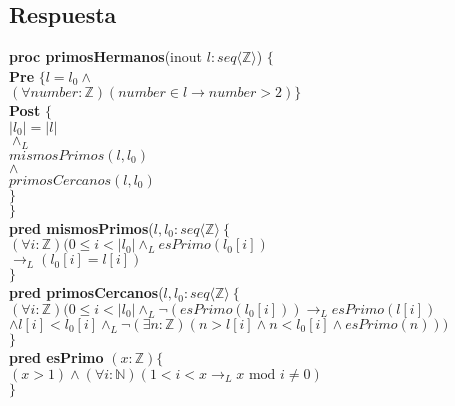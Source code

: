 \documentclass[a4paper]{article}
\begin{document}
\subsection*{Respuesta}
			
			\textbf{proc primosHermanos}(inout $l:seq\langle \mathbb{Z}\rangle$) $\{$\smallskip \\
			\hspace*{6mm} \textbf{Pre }$\{l=l_0 \wedge$\\
			\hspace*{6mm} $(\forall number:\mathbb{Z})(number\in l \rightarrow
			 number>2)\}$\smallskip \\
			\hspace*{6mm} \textbf{Post }$\{$\\
			\hspace*{6mm} $|l_0|=|l|$\\
			\hspace*{6mm} $\wedge_L$\\
			\hspace*{6mm} $mismosPrimos(l,l_0 )$\\
			\hspace*{6mm} $\wedge$\\
			\hspace*{6mm} $primosCercanos(l,l_0)$\\
			\hspace*{6mm} $\}$\\
			\hspace*{5mm}$\}$\smallskip \\
			
			\textbf{pred mismosPrimos}($l,l_0: seq\langle\mathbb{Z}\rangle
			\ \{$\smallskip \\
			\hspace*{6mm}$(\forall i:\mathbb{Z})(0\leq i < |l_0|\wedge_L esPrimo(l_0[i])$\\
			\hspace*{6mm}$\rightarrow_L(l_0[i]=l[i])$\\
			\hspace*{5mm}$\}$\smallskip \\
			
			\textbf{pred primosCercanos}($l,l_0: seq\langle\mathbb{Z}\rangle
			\ \{$\smallskip \\
			\hspace*{6mm}$(\forall i:\mathbb{Z})(0\leq i<|l_0|\wedge_L\neg(esPrimo(l_0[i]))
			\rightarrow_L esPrimo(l[i])$\\
			\hspace*{6mm}$\wedge l[i]<l_0[i]\wedge_L \neg(\exists n:\mathbb{Z})(n>l[i]\wedge
			n<l_0[i]\wedge esPrimo(n)))$\\
			\hspace*{5mm}$\}$\smallskip \\
			
			\textbf{pred esPrimo} $(x: \mathbb{Z})\{$\\ 
			\hspace*{6mm}$ (x > 1)\wedge(\forall i :\mathbb{N})
			(1<i<x \rightarrow _L x\textrm{ mod }i\neq 0 )$\\
			\hspace*{5mm}$\}$
\end{document}
